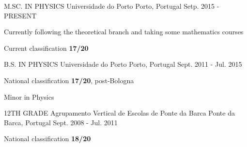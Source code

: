 

\begin{cventries}
	
	\cventry
	{M.SC. IN PHYSICS} %
	{Universidade do Porto} %
	{Porto, Portugal} %
	{Setp. 2015 - PRESENT} %
	{
		\begin{cvitems} %
			\item {Currently following the theoretical branch and taking some mathematics courses}
			\item {Current classification \textbf{17/20}}
		\end{cvitems}
	}
	
	\cventry
	{B.S. IN PHYSICS} %
	{Universidade do Porto} %
	{Porto, Portugal} %
	{Sept. 2011 - Jul. 2015} %
	{
		\begin{cvitems} %
			\item {National classification \textbf{17/20}, post-Bologna}
			\item {Minor in Physics}
		\end{cvitems}
	}
	
	\cventry
	{{\normalsize 12}TH GRADE} %
	{Agrupamento Vertical de Escolas de Ponte da Barca} %
	{Ponte da Barca, Portugal} %
	{Sept. 2008 - Jul. 2011} %
	{
		\begin{cvitems} %
			\item {National classification \textbf{18/20}}
		\end{cvitems}
	}
	
\end{cventries}
